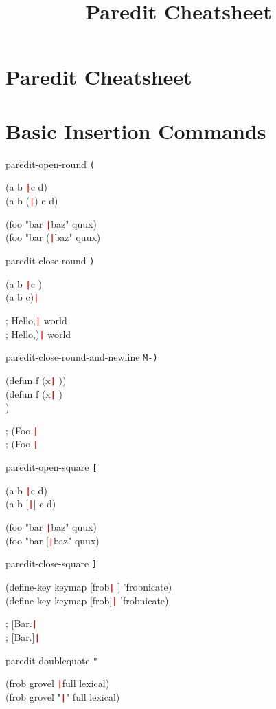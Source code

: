 \documentclass[8pt,landscape,a4paper]{article}
\title{Paredit Cheatsheet}
\begin{document}
  \newcommand{\cursor}{\texttt{\textcolor{red}{\textbf{|}}}}

  \begin{multicols}{4}

    \section*{\LARGE{Paredit Cheatsheet}}

    \section*{Basic Insertion Commands}

paredit-open-round \texttt{(}

{\ttfamily
(a b \cursor c d)\\
(a b (\cursor) c d)

(foo "bar \cursor baz" quux)\\
(foo "bar (\cursor baz" quux)
}

paredit-close-round \texttt{)}

{\ttfamily
(a b \cursor c \space\space)\\
(a b c)\cursor

; Hello,\cursor{} world\\
; Hello,)\cursor{} world
}

paredit-close-round-and-newline \texttt{M-)}

{\ttfamily
(defun f (x\cursor{} \space))\\
(defun f (x\cursor{} \space)\\
)

; (Foo.\cursor\\
; (Foo.\cursor
}

paredit-open-square \texttt{[}

{\ttfamily
(a b \cursor c d)\\
(a b [\cursor] c d)

(foo "bar \cursor baz" quux)\\
(foo "bar [\cursor baz" quux)
}

paredit-close-square \texttt{]}

{\ttfamily
(define-key keymap [frob\cursor{} \space] 'frobnicate)\\
(define-key keymap [frob]\cursor{} 'frobnicate)

; [Bar.\cursor\\
; [Bar.]\cursor
}

paredit-doublequote \texttt{"}

{\ttfamily
(frob grovel \cursor full lexical)\\
(frob grovel "\cursor " full lexical)

}
\end{multicols}
\end{document}
